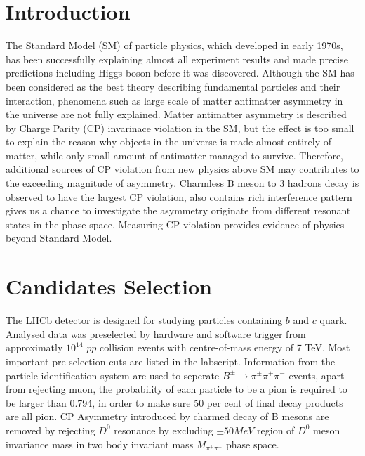 \documentclass[12pt, twoside, notitlepage, twocolumn]{article}
\newcommand{\makeabs}
    {
        \textbf{Abstract:}
        A set of selected $p p$ collision data samples which were collected by LHCb\cite{1748-0221-3-08-S08005} in 2011 are studied.
        Contained $B^{\pm}\rightarrow\pi^{\pm}\pi^{+}\pi^{-}$ decays in magnet ``up'' and ``down'' 
        polarity are constructed. Global $CP$ asymmetry in this channal is measured to be 
        $A_{CP}=0.126\pm0.023\pm0.026$,
        in which the first and second uncertainties are statistical and systematical respectively. 
        Larger local asymmetry in different phasespace is also observed.
        \newline\hbox{}
    }
\newcommand{\makeauth}
    {
        Qichen Dong, Harriet Watson\newline
        School of Physics and Astronomy, University of Manchester, Manchester, M13 9PL.
    }
\newcommand{\maketit} 
    {
        \textbf{Measurement of $\bm{CP}$ Violation in $\bm{B^{\pm}\rightarrow\pi^{\pm}\pi^{+}\pi^{-}}$ 
        Decay Channal at Large Hadron Collider}
    }
\begin{document}
        \twocolumn[\begin{@twocolumnfalse}
            \begin{flushleft}
                \maketit
                \makeauth
            \end{flushleft}
            \makeabs
        \end{@twocolumnfalse}]

        \section{Introduction}
        The Standard Model\cite{1412.4094} (SM) of particle physics, which developed in early 1970s, has been successfully 
        explaining almost all experiment results and made precise predictions including Higgs boson before 
        it was discovered. Although the SM has been considered as the best theory describing 
        fundamental particles and their interaction, phenomena such as large scale of matter antimatter 
        asymmetry in the universe are not fully explained. Matter antimatter asymmetry is described by Charge
        Parity (CP) invarinace violation in the SM, but the effect is too small to explain the reason 
        why objects in the universe is made almost entirely of matter, while only small amount of antimatter 
        managed to survive. Therefore, additional sources of CP violation from new physics above SM
        may contributes to the exceeding magnitude of asymmetry. Charmless B meson to 3 hadrons decay is observed 
        to have the largest CP violation, also contains rich interference pattern gives us a chance to investigate 
        the asymmetry originate from different resonant states in the phase space.\cite{1310.4740} Measuring CP 
        violation provides evidence of physics beyond Standard Model.
        \section{Candidates Selection}
        The LHCb\cite{1748-0221-3-08-S08005} detector is designed for studying particles containing $b$ and $c$ quark.
        Analysed data was preselected by hardware and software trigger from approximatly $10^{14}$ $pp$ collision 
        events with centre-of-mass energy of 7 TeV. Most important pre-selection cuts are listed in the labscript\cite{Labsc}.
        \newline Information from the particle identification system\cite{1211.6759} are used to seperate
        $B^{\pm}\rightarrow\pi^{\pm}\pi^{+}\pi^{-}$ events, apart from rejecting muon, the probability of each 
        particle to be a pion is required to be larger than 0.794, in order to make sure 50 per cent of final decay 
        products are all pion. CP Asymmetry introduced by charmed decay of B mesons are removed by rejecting $D^0$ 
        resonance by excluding $\pm 50MeV$ region of $D^0$ meson invariance mass in two body invariant mass 
        $M_{\pi^+\pi^-}$ phase space. 
\end{document}
